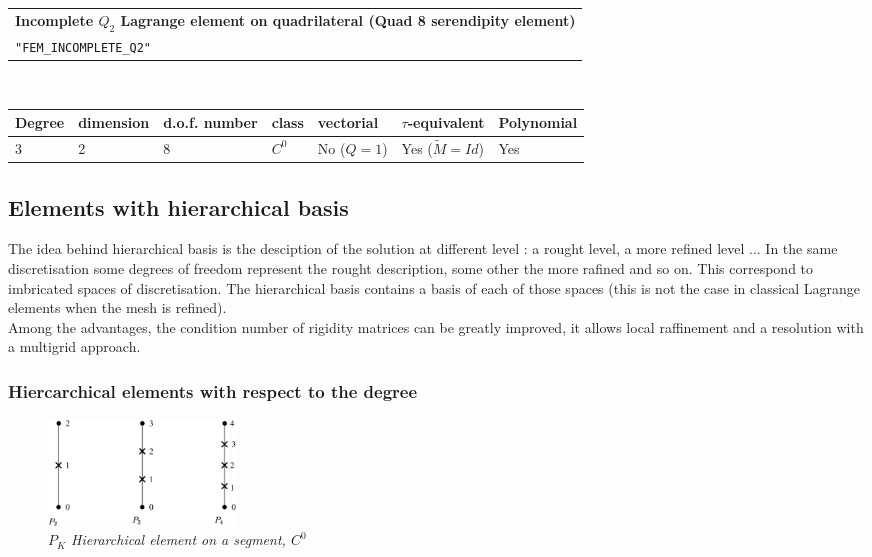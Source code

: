 \documentclass[11pt,a4paper]{article}
\begin{document}
\begin{center}
\begin{tabular}{|m{16.109cm}|} \hline 
{\bf Incomplete $Q_2$ Lagrange element on quadrilateral (Quad 8 serendipity element)}\\
{\tt "FEM\_INCOMPLETE\_Q2"} 
\end{tabular} \\ \vspace{-1pt} 
\begin{tabular}{|m{2cm}|m{2cm}|m{2.5cm}|m{1.5cm}|m{1.5cm}|m{2cm}|m{2cm}|} \hline 
Degree & dimension & d.o.f. number & class & vectorial & \mbox{$\tau$-equivalent} & Polynomial \\ \hline
\small $3$ & 2 & 8 & $C^0$ & No \mbox{($Q = 1$)} & Yes \mbox{($\tilde{M} = Id$)}  & Yes \\ \hline
\end{tabular}
\end{center}

\subsection{Elements with hierarchical basis}

The idea behind hierarchical basis is the desciption of the solution at different level : a rought level, a more refined level ... In the same discretisation some degrees of freedom represent the rought description, some other the more rafined and so on. This correspond to imbricated spaces of discretisation. The hierarchical basis contains a basis of each of those spaces (this is not the case in classical Lagrange elements when the mesh is refined).\\[0.5cm]
Among the advantages, the condition number of  rigidity matrices can be greatly improved, it allows local raffinement and a resolution with a multigrid approach.


\subsubsection{Hiercarchical elements with respect to the degree}

\begin{figure}[H]
  \begin{center}
    \includegraphics[width=5cm,angle=0]{getfemlist_segment_hier.eps}
  \end{center}
  \caption{ \it $P_K$ Hierarchical element on a segment, $C^0$} 
  \label{fig:seg_hier}
\end{figure}
\end{document}
